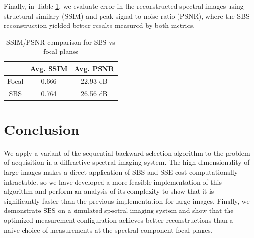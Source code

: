 \documentclass{article}
\begin{document}
Finally, in Table \ref{tab:ssims}, we evaluate error in the reconstructed
spectral images using structural similary (SSIM) and peak signal-to-noise ratio
(PSNR), where the SBS reconstruction yielded better results measured by both metrics.

\vspace{-0.15 in}
\begin{table}[h]
\caption{SSIM/PSNR comparison for SBS vs focal planes}
\vspace{0.08 in}
\centering
\begin{tabular}{|c|c|c|}
\hline
      & Avg. SSIM  & Avg. PSNR  \\ \hline
Focal & 0.666 & 22.93 dB \\ \hline
SBS  & 0.764 & 26.56 dB \\ \hline
\end{tabular}
\label{tab:ssims}
\end{table}
\vspace{-0.15 in}

\section{Conclusion}

We apply a variant of the sequential backward selection algorithm to the problem
of acquisition in a diffractive spectral imaging system.  The high
dimensionality of large images makes a direct application of SBS and SSE cost
computationally intractable, so we have developed a more feasible implementation
of this algorithm and perform an analysis of its complexity to show that it is
significantly faster than the previous implementation for large images.
Finally, we demonstrate SBS on a simulated spectral imaging system and show that
the optimized measurement configuration achieves better reconstructions than a
naive choice of measurements at the spectral component focal planes.

\vfill\pagebreak



\end{document}
